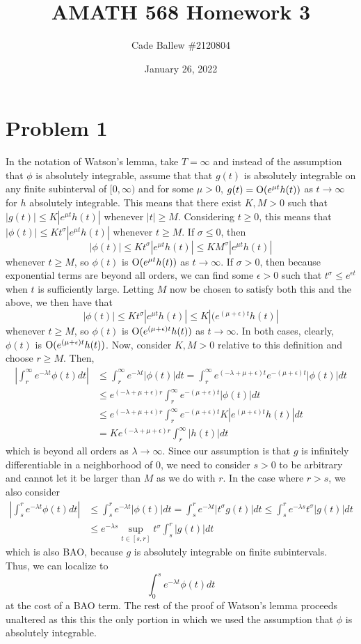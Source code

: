 \documentclass{article}
\title{AMATH 568 Homework 3}
\author{Cade Ballew \#2120804}
\date{January 26, 2022}
\begin{document}
	
\maketitle
	
\section{Problem 1}
In the notation of Watson's lemma, take $T=\infty$ and instead of the assumption that $\phi$ is absolutely integrable, assume that that $g(t)$ is absolutely integrable on any finite subinterval of $[0,\infty)$ and for some $\mu > 0$, $g(t) = \operatorname{O}(e^{\mu t} h(t))$ as $t \to \infty$ for $h$ absolutely integrable. This means that there exist $K,M>0$ such that $|g(t)|\leq K|e^{\mu t}h(t)|$ whenever $|t|\geq M$. Considering $t\geq0$, this means that $|\phi(t)|\leq Kt^\sigma|e^{\mu t}h(t)|$ whenever $t\geq M$. If $\sigma\leq0$, then
\[
|\phi(t)|\leq Kt^\sigma|e^{\mu t}h(t)|\leq KM^\sigma|e^{\mu t}h(t)|
\]
whenever $t\geq M$, so $\phi(t)$ is $\operatorname{O}(e^{\mu t}h(t))$ as $t\to\infty$. If $\sigma>0$, then because exponential terms are beyond all orders, we can find some $\epsilon>0$ such that $t^\sigma\leq e^{\epsilon t}$ when $t$ is sufficiently large. Letting $M$ now be chosen to satisfy both this and the above, we then have that 
\[
|\phi(t)|\leq Kt^\sigma|e^{\mu t}h(t)|\leq K|(e^{(\mu+\epsilon) t}h(t)|
\]
whenever $t\geq M$, so $\phi(t)$ is $\operatorname{O}(e^{(\mu+\epsilon) t}h(t))$ as $t\to\infty$. In both cases, clearly, $\phi(t)$ is $\operatorname{O}(e^{(\mu+\epsilon) t}h(t))$. Now, consider $K,M>0$ relative to this definition and choose $r\geq M$. Then, 
\begin{align*}
\left|\int_r^\infty e^{-\lambda t}\phi(t)dt\right|&\leq\int_r^\infty e^{-\lambda t}|\phi(t)|dt=\int_r^\infty e^{(-\lambda+\mu+\epsilon) t}e^{-(\mu+\epsilon) t}|\phi(t)|dt\\&
\leq e^{(-\lambda+\mu+\epsilon) r}\int_r^\infty e^{-(\mu+\epsilon) t}|\phi(t)|dt\\&\leq
e^{(-\lambda+\mu+\epsilon) r}\int_r^\infty e^{-(\mu+\epsilon) t}K|e^{(\mu+\epsilon) t}h(t)|dt\\&=
Ke^{(-\lambda+\mu+\epsilon) r}\int_r^\infty|h(t)|dt
\end{align*}
which is beyond all orders as $\lambda\to\infty$. Since our assumption is that $g$ is infinitely differentiable in a neighborhood of $0$, we need to consider $s>0$ to be arbitrary and cannot let it be larger than $M$ as we do with $r$. In the case where $r>s$, we also consider
\begin{align*}
\left|\int_s^r e^{-\lambda t}\phi(t)dt\right|&\leq\int_s^r e^{-\lambda t}|\phi(t)|dt=\int_s^r e^{-\lambda t}|t^\sigma g(t)|dt\leq\int_s^r e^{-\lambda s}t^\sigma|g(t)|dt\\&\leq
e^{-\lambda s}\sup_{t\in[s,r]}t^\sigma\int_s^r|g(t)|dt 
\end{align*}
which is also BAO, because $g$ is absolutely integrable on finite subintervals. 
\\Thus, we can  localize to 
\[
\int_0^s e^{-\lambda t}\phi(t)dt
\]
at the cost of a BAO term. The rest of the proof of Watson's lemma proceeds unaltered as this this the only portion in which we used the assumption that $\phi$ is absolutely integrable.
\end{document}
